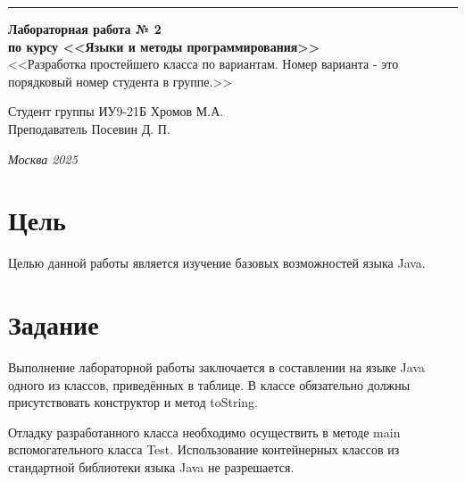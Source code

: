 \documentclass[a4paper, 14pt]{extarticle}
\begin{document}
\begin{titlepage}
\vspace*{-16pt}
\hspace{30pt}\rule{0.866\textwidth}{0.4pt}
  
\vspace{11em}

\begin{center}
\Large {\bf Лабораторная работа № 2} \\ 
\large {\bf по курсу <<Языки и методы программирования>>} \\ 
\large <<Разработка простейшего класса по вариантам. Номер варианта - это порядковый номер студента в группе.>>
\end{center}\normalsize

\vspace{8em}


\begin{flushright}
  {Студент группы ИУ9-21Б Хромов М.А.\hspace*{15pt} \\
  \vspace{2ex}
  Преподаватель Посевин Д. П.\hspace*{15pt}}
\end{flushright}

\bigskip

\vfill
 

\begin{center}
\textsl{Москва 2025}
\end{center}
\end{titlepage}

\renewcommand{\ttdefault}{pcr}

\setlength{\tabcolsep}{3pt}
\newpage
\section{Цель}\label{Sect::task}
\par
Целью данной работы является изучение базовых возможностей языка Java.  

\section{Задание}\label{Sect::task}
\par
Выполнение лабораторной работы заключается в составлении на языке Java одного из классов, приведённых в таблице. В классе обязательно должны присутствовать конструктор и метод toString.
\par
Отладку разработанного класса необходимо осуществить в методе main вспомогательного класса Test. Использование контейнерных классов из стандартной библиотеки языка Java не разрешается.
\end{document}
